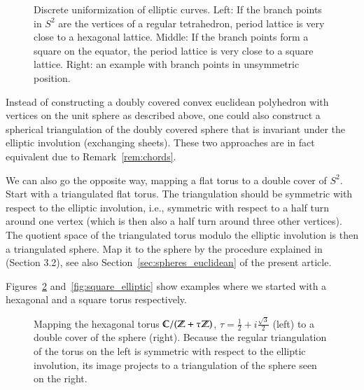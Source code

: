 \documentclass[Thesis]{subfiles}
\begin{document}
\begin{figure}
\centering
{}
\caption{Discrete uniformization of elliptic curves. Left: If the
  branch points in $S^{2}$ are the vertices of a regular tetrahedron,
  period lattice is very close to a hexagonal lattice. Middle: If the
  branch points form a square on the equator, the period lattice is
  very close to a square lattice. Right: an example with branch points
  in unsymmetric position.}
\label{fig:p_functions}
\end{figure}

\begin{remark}
  Instead of constructing a doubly covered convex euclidean polyhedron
  with vertices on the unit sphere as described above, one could also
  construct a spherical triangulation of the doubly covered sphere
  that is invariant under the elliptic involution (exchanging
  sheets). These two approaches are in fact equivalent due to
  Remark~\ref{rem:chords}. 
\end{remark}

 We can
also go the opposite way, mapping a flat torus to a double cover of
$S^{2}$. Start with a triangulated flat torus. The triangulation
should be symmetric with respect to the elliptic involution, i.e.,
symmetric with respect to a half turn around one vertex (which is then
also a half turn around three other vertices). The quotient space of
the triangulated torus modulo the elliptic involution is then a
triangulated sphere. Map it to the sphere by the procedure explained
in~\cite{BPS2015:dconf} (Section 3.2), see also
Section~\ref{sec:spheres_euclidean} of the present article.

Figures~\ref{fig:wente_elliptic} and~\ref{fig:square_elliptic} show
examples where we started with a hexagonal and a square torus
respectively. 

\begin{figure}
\centering
{}
\caption{Mapping the hexagonal torus $\mathbb C/(\mathbb Z+\tau\mathbb Z)$,
  $\tau=\tfrac{1}{2}+i\tfrac{\sqrt 3}{2}$ (left) to a double cover of
  the sphere (right). Because the regular triangulation of the torus
  on the left is symmetric with respect to the elliptic involution,
  its image projects to a triangulation of the sphere seen on the right.} 
\label{fig:wente_elliptic}
\end{figure}
\end{document}
